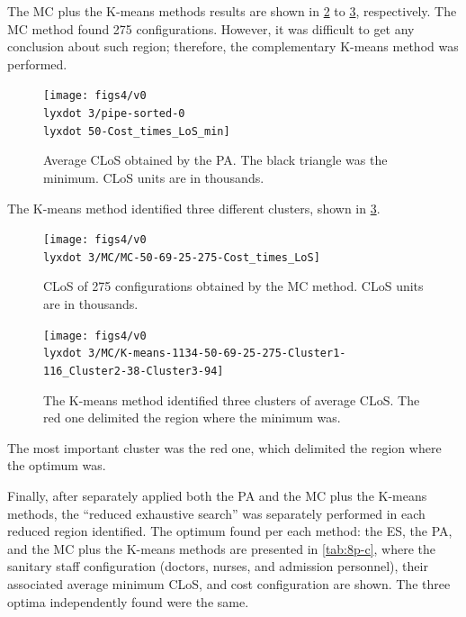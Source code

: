 The MC plus the K-means methods results are shown in \ref{subfig:mc8-3}
to \ref{subfig:km8-3}, respectively. The MC method found 275 configurations.
However, it was difficult to get any conclusion about such region;
therefore, the complementary K-means method was performed.
\begin{figure}[H]
\centering{}\texttt{[image: figs4/v0\\lyxdot 3/pipe-sorted-0\\lyxdot 50-Cost\_times\_LoS\_min]}\caption{Average CLoS obtained by the PA. The black triangle was the minimum.
CLoS units are in thousands. \label{subfig:pipe8-3} }
\end{figure}
The K-means method identified three different clusters, shown in \ref{subfig:km8-3}.
\begin{figure}[H]
\centering{}\texttt{[image: figs4/v0\\lyxdot 3/MC/MC-50-69-25-275-Cost\_times\_LoS]}\caption{CLoS of 275 configurations obtained by the MC method. CLoS units are
in thousands. \label{subfig:mc8-3}}
\end{figure}
\begin{figure}[H]
\begin{centering}
\texttt{[image: figs4/v0\\lyxdot 3/MC/K-means-1134-50-69-25-275-Cluster1-116\_Cluster2-38-Cluster3-94]}
\par\end{centering}

\caption{The K-means method identified three clusters of average CLoS. The
red one delimited the region where the minimum was. \label{subfig:km8-3}}
\end{figure}
 The most important cluster was the red one, which delimited the region
where the optimum was. 

Finally, after separately applied both the PA and the MC plus the
K-means methods, the \textquotedblleft{}reduced exhaustive search\textquotedblright{}
was separately performed in each reduced region identified. The optimum
found per each method: the ES, the PA, and the MC plus the K-means
methods are presented in \ref{tab:8p-c}, where the sanitary staff
configuration (doctors, nurses, and admission personnel), their associated
average minimum CLoS, and cost configuration are shown. The three
optima independently found were the same.

